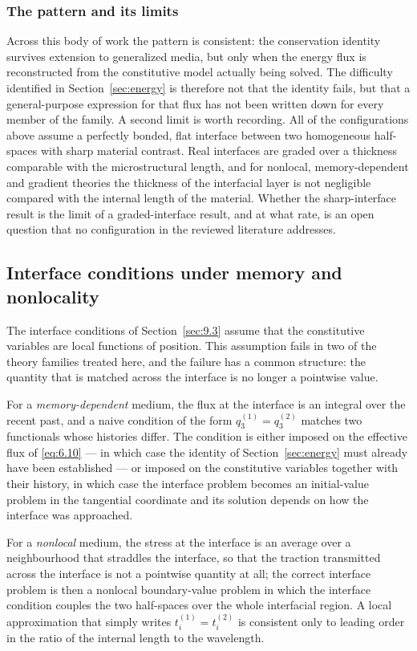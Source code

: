 \subsubsection{The pattern and its limits}

Across this body of work the pattern is consistent: the conservation identity survives extension to generalized media, but only when the energy flux is reconstructed from the constitutive model actually being solved. The difficulty identified in Section~\ref{sec:energy} is therefore not that the identity fails, but that a general-purpose expression for that flux has not been written down for every member of the family. A second limit is worth recording. All of the configurations above assume a perfectly bonded, flat interface between two homogeneous half-spaces with sharp material contrast. Real interfaces are graded over a thickness comparable with the microstructural length, and for nonlocal, memory-dependent and gradient theories the thickness of the interfacial layer is not negligible compared with the internal length of the material. Whether the sharp-interface result is the limit of a graded-interface result, and at what rate, is an open question that no configuration in the reviewed literature addresses.

\subsection{Interface conditions under memory and nonlocality}
\label{sec:9.8}

The interface conditions of Section~\ref{sec:9.3} assume that the constitutive variables are local functions of position. This assumption fails in two of the theory families treated here, and the failure has a common structure: the quantity that is matched across the interface is no longer a pointwise value.

For a \emph{memory-dependent} medium, the flux at the interface is an integral over the recent past, and a naive condition of the form $q_3^{(1)} = q_3^{(2)}$ matches two functionals whose histories differ. The condition is either imposed on the effective flux of \eqref{eq:6.10} --- in which case the identity of Section~\ref{sec:energy} must already have been established --- or imposed on the constitutive variables together with their history, in which case the interface problem becomes an initial-value problem in the tangential coordinate and its solution depends on how the interface was approached.

For a \emph{nonlocal} medium, the stress at the interface is an average over a neighbourhood that straddles the interface, so that the traction transmitted across the interface is not a pointwise quantity at all; the correct interface problem is then a nonlocal boundary-value problem in which the interface condition couples the two half-spaces over the whole interfacial region. A local approximation that simply writes $t_i^{(1)} = t_i^{(2)}$ is consistent only to leading order in the ratio of the internal length to the wavelength.


